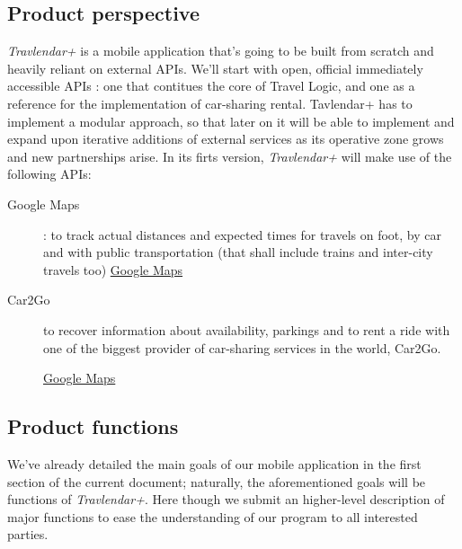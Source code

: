 \subsection{Product perspective}

\textit{Travlendar+} is a mobile application that’s going to be built from scratch and heavily reliant on external APIs. 
We’ll start with open, official immediately accessible APIs : one that contitues the core of Travel Logic, and one as a reference for the implementation of car-sharing rental. 
Tavlendar+ has to implement a modular approach, so that later on it will be able to implement and expand upon iterative additions of external services as its operative zone grows and new partnerships arise.
In its firts version, \textit{Travlendar+} will make use of the following APIs:
\begin{description}

	\item[Google Maps] : to track actual distances and expected times for travels on foot, by car and with public transportation (that shall include trains and inter-city travels too) 
	\href{https://developers.google.com/maps/}{Google Maps}
	\item[Car2Go] to recover information about availability, parkings and to rent a ride with one of the biggest provider of car-sharing services in the world, Car2Go.
	
	\href{https://developers.google.com/maps/}{Google Maps}


\end{description}


			
\subsection{Product functions}
	
 We’ve already detailed the main goals of our mobile application in the first section of the current document; naturally, the aforementioned goals will be functions of \textit{Travlendar+}.
Here though we submit an higher-level description of major functions to ease the understanding of our program to all interested parties.
		
